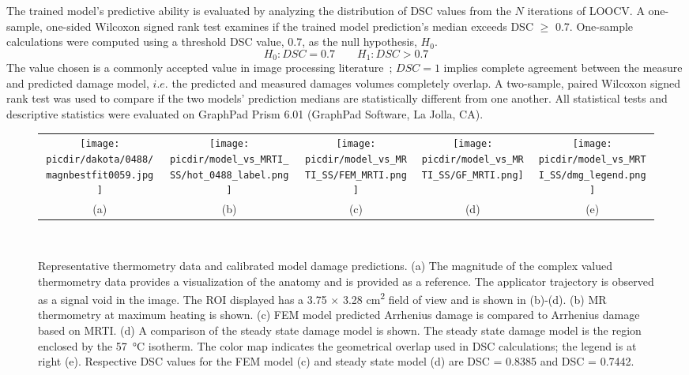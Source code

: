 \documentclass[12pt]{article}
\newcommand{\picdir}{pdffig}
\begin{document}
The trained model's predictive ability is
evaluated by analyzing the distribution of DSC values from the $N$ iterations of
LOOCV. 
A one-sample, one-sided Wilcoxon signed rank test examines if the trained
model prediction's median exceeds DSC $\geq$ 0.7. 
One-sample calculations were computed using a threshold DSC value, $0.7$, as 
the null hypothesis, $H_0$.
\[
   H_0: DSC  = 0.7  \qquad   H_1: DSC > 0.7
\]
{\color{red}
The value chosen is a commonly accepted value in image processing
literature~\cite{yung2010quantitative,Dice1945measures,zou2004three};  
$DSC=1$ implies complete agreement between the measure and predicted damage model,
$i.e.$ the predicted and measured damages volumes completely overlap.
}
A two-sample, paired Wilcoxon signed rank test was used to compare if the two models'
prediction medians are statistically different from one another.
All statistical tests and descriptive statistics were evaluated on
GraphPad Prism 6.01 (GraphPad Software, La Jolla, CA).

\begin{figure}[p!] 
\begin{tabular}{ccccc} 

\scalebox{0.16}{\texttt{[image: \\picdir/dakota/0488/magnbestfit0059.jpg]}} & \scalebox{0.257}{\texttt{[image: \\picdir/model\_vs\_MRTI\_SS/hot\_0488\_label.png]}}  & \scalebox{0.32}{\texttt{[image: \\picdir/model\_vs\_MRTI\_SS/FEM\_MRTI.png]}} & \scalebox{0.295}{\texttt{[image: \\picdir/model\_vs\_MRTI\_SS/GF\_MRTI.png]}} & \scalebox{0.28}{\texttt{[image: \\picdir/model\_vs\_MRTI\_SS/dmg\_legend.png]}}
\\
(a) & (b) & (c) & (d) & (e) \\
\end{tabular}
\\
\caption{Representative thermometry data and calibrated model damage predictions.
(a) The magnitude of the complex valued thermometry data provides a visualization
of the anatomy and is provided as a reference. The applicator trajectory
is observed as a signal void in the image. The ROI displayed has a 
3.75 $\times$ 3.28 \si{\cm\squared} field of view and is shown in (b)-(d).
(b) MR thermometry at maximum heating is shown.
(c) FEM model predicted Arrhenius damage is compared to
Arrhenius damage based on MRTI.
(d) A comparison of the steady state damage model is shown.
The steady state damage model 
is the region enclosed by the \SI{57}{\degreeCelsius} isotherm. 
The color map indicates the geometrical overlap used in DSC calculations;
the legend is at right (e).
Respective DSC values for the FEM model (c) and steady state
model (d) are DSC = 0.8385 and DSC = 0.7442.
}  
\label{RepresentativeData}
\end{figure}
\end{document}
